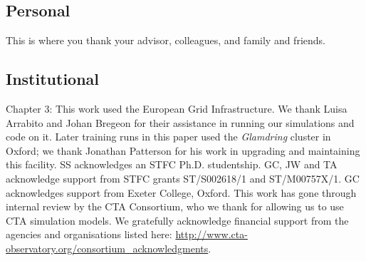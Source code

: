 \subsection*{Personal}

This is where you thank your advisor, colleagues, and family and friends.


\subsection*{Institutional}

Chapter 3: This work used the European Grid Infrastructure. We thank Luisa Arrabito and Johan Bregeon for their assistance in running our simulations and code on it. Later training runs in this paper used the \textit{Glamdring} cluster in Oxford; we thank Jonathan Patterson for his work in upgrading and maintaining this facility. SS acknowledges an STFC Ph.D. studentship. GC, JW and TA acknowledge support from STFC grants ST/S002618/1 and ST/M00757X/1. GC acknowledges support from Exeter College, Oxford. This work has gone through internal review by the CTA Consortium, who we thank for allowing us to use CTA simulation models. We gratefully acknowledge financial support from the agencies and organisations listed here: \url{http://www.cta-observatory.org/consortium\_acknowledgments}.
